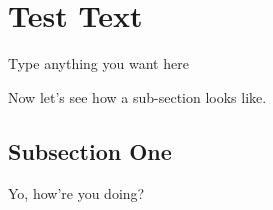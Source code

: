 
\section{Test Text}
\label{sec:text}


Type anything you want here

Now let's see how a sub-section looks like.

\subsection{Subsection One}

Yo, how're you doing?



 

